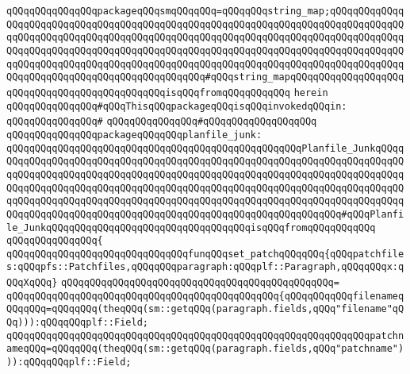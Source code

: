 \verb|qQQqqQQqqQQqqQQqpackageqQQqsmqQQqqQQq=qQQqqQQqstring_map;qQQqqQQqqQQqqQQqqQQqqQQqqQQqqQQqqQQqqQQqqQQqqQQqqQQqqQQqqQQqqQQqqQQqqQQqqQQqqQQqqQQqqQQqqQQqqQQqqQQqqQQqqQQqqQQqqQQqqQQqqQQqqQQqqQQqqQQqqQQqqQQqqQQqqQQqqQQqqQQqqQQqqQQqqQQqqQQqqQQqqQQqqQQqqQQqqQQqqQQqqQQqqQQqqQQqqQQqqQQqqQQqqQQqqQQqqQQqqQQqqQQqqQQqqQQqqQQqqQQqqQQqqQQqqQQqqQQqqQQqqQQqqQQqqQQqqQQqqQQqqQQqqQQqqQQqqQQqqQQqqQQqqQQq#qQQqstring_mapqQQqqQQqqQQqqQQqqQQqqQQqqQQqqQQqqQQqqQQqqQQqqQQqisqQQqfromqQQqqQQqqQQq|\newline
\verb|herein|\newline
\newline
\verb|qQQqqQQqqQQqqQQq#qQQqThisqQQqpackageqQQqisqQQqinvokedqQQqin:|\newline
\verb|qQQqqQQqqQQqqQQq#|\newline
\verb|qQQqqQQqqQQqqQQq#qQQqqQQqqQQqqQQqqQQq|\newline
\newline
\verb|qQQqqQQqqQQqqQQqpackageqQQqqQQqplanfile_junk:|\newline
\verb|qQQqqQQqqQQqqQQqqQQqqQQqqQQqqQQqqQQqqQQqqQQqqQQqqQQqPlanfile_JunkqQQqqQQqqQQqqQQqqQQqqQQqqQQqqQQqqQQqqQQqqQQqqQQqqQQqqQQqqQQqqQQqqQQqqQQqqQQqqQQqqQQqqQQqqQQqqQQqqQQqqQQqqQQqqQQqqQQqqQQqqQQqqQQqqQQqqQQqqQQqqQQqqQQqqQQqqQQqqQQqqQQqqQQqqQQqqQQqqQQqqQQqqQQqqQQqqQQqqQQqqQQqqQQqqQQqqQQqqQQqqQQqqQQqqQQqqQQqqQQqqQQqqQQqqQQqqQQqqQQqqQQqqQQqqQQqqQQqqQQqqQQqqQQqqQQqqQQqqQQqqQQqqQQqqQQqqQQqqQQqqQQqqQQqqQQqqQQqqQQqqQQq#qQQqPlanfile_JunkqQQqqQQqqQQqqQQqqQQqqQQqqQQqqQQqqQQqisqQQqfromqQQqqQQqqQQq|\newline
\verb|qQQqqQQqqQQqqQQq{|\newline
\verb|qQQqqQQqqQQqqQQqqQQqqQQqqQQqqQQqfunqQQqset_patchqQQqqQQq{qQQqpatchfiles:qQQqpfs::Patchfiles,qQQqqQQqparagraph:qQQqplf::Paragraph,qQQqqQQqx:qQQqXqQQq}|\newline
\verb|qQQqqQQqqQQqqQQqqQQqqQQqqQQqqQQqqQQqqQQqqQQqqQQq=|\newline
\verb|qQQqqQQqqQQqqQQqqQQqqQQqqQQqqQQqqQQqqQQqqQQqqQQq{qQQqqQQqqQQqfilenameqQQqqQQq=qQQqqQQq(theqQQq(sm::getqQQq(paragraph.fields,qQQq"filename"qQQq))):qQQqqQQqplf::Field;|\newline
\verb|qQQqqQQqqQQqqQQqqQQqqQQqqQQqqQQqqQQqqQQqqQQqqQQqqQQqqQQqqQQqqQQqpatchnameqQQq=qQQqqQQq(theqQQq(sm::getqQQq(paragraph.fields,qQQq"patchname"))):qQQqqQQqplf::Field;|\newline
